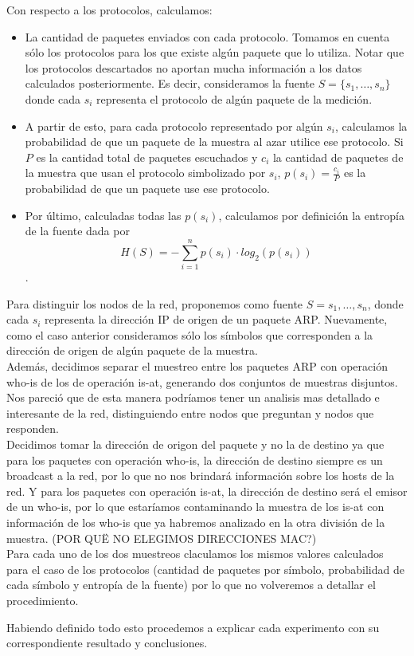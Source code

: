 Con respecto a los protocolos, calculamos:
\begin{itemize}
\item La cantidad de paquetes enviados con cada protocolo. Tomamos en cuenta sólo los protocolos para los que existe algún paquete que lo utiliza. Notar que los protocolos descartados no aportan mucha información a los datos calculados posteriormente. Es decir, consideramos la fuente $S = \{ s_1, \ldots, s_n \}$ donde cada $s_i$ representa el protocolo de algún paquete de la medición.
\item A partir de esto, para cada protocolo representado por algún $s_i$, calculamos la probabilidad de que un paquete de la muestra al azar utilice ese protocolo. Si $P$ es la cantidad total de paquetes escuchados y $c_i$ la cantidad de paquetes de la muestra que usan el protocolo simbolizado por $s_i$, $p(s_i) = \frac{c_i}{P}$ es la probabilidad de que un paquete use ese protocolo.
\item Por último, calculadas todas las $p(s_i)$, calculamos por definición la entropía de la fuente dada por $$H(S) = - \sum_{i=1}^{n} p(s_i) \cdot log_2(p(s_i))$$.
\end{itemize}
\bigskip
Para distinguir los nodos de la red, proponemos como fuente $S = {s_1, \ldots, s_n}$, donde cada $s_i$ representa la dirección IP de origen de un paquete ARP. Nuevamente, como el caso anterior consideramos sólo los símbolos que corresponden a la dirección de origen de algún paquete de la muestra.\\
Además, decidimos separar el muestreo entre los paquetes ARP con operación who-is de los de operación is-at, generando dos conjuntos de muestras disjuntos. Nos pareció que de esta manera podríamos tener un analisis mas detallado e interesante de la red, distinguiendo entre nodos que preguntan y nodos que responden.\\
Decidimos tomar la dirección de origon del paquete y no la de destino ya que para los paquetes con operación who-is, la dirección de destino siempre es un broadcast a la red, por lo que no nos brindará información sobre los hosts de la red. Y para los paquetes con operación is-at, la dirección de destino será el emisor de un who-is, por lo que estaríamos contaminando la muestra de los is-at con información de los who-is que ya habremos analizado en la otra división de la muestra. (POR QUË NO ELEGIMOS DIRECCIONES MAC?)\\
Para cada uno de los dos muestreos claculamos los mismos valores calculados para el caso de los protocolos (cantidad de paquetes por símbolo, probabilidad de cada símbolo y entropía de la fuente) por lo que no volveremos a detallar el procedimiento.\bigskip

Habiendo definido todo esto procedemos a explicar cada experimento con su correspondiente resultado y conclusiones. 

